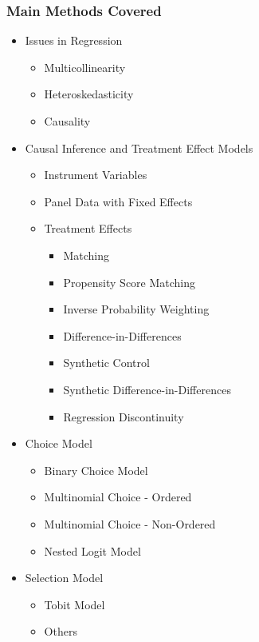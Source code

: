 \documentclass[10pt]{beamer}
\begin{document}
\begin{frame}
\frametitle{Main Methods Covered}
\begin{itemize}
    \item Issues in Regression
    \begin{itemize}
        \item Multicollinearity
        \item Heteroskedasticity
        \item Causality
    \end{itemize}
    
    \item Causal Inference and Treatment Effect Models
    \begin{itemize}
        \item Instrument Variables
        \item Panel Data with Fixed Effects
        \item Treatment Effects
        \begin{itemize}
            \item Matching
            \item Propensity Score Matching
            \item Inverse Probability Weighting
            \item Difference-in-Differences
            \item Synthetic Control
            \item Synthetic Difference-in-Differences
            \item Regression Discontinuity
        \end{itemize}
    \end{itemize}

    \item Choice Model
    \begin{itemize}
        \item Binary Choice Model
        \item Multinomial Choice - Ordered
        \item Multinomial Choice - Non-Ordered
        \item Nested Logit Model
    \end{itemize}

    \item Selection Model
    \begin{itemize}
        \item Tobit Model
        \item Others
    \end{itemize}
\end{itemize}
\end{frame}
\end{document}
